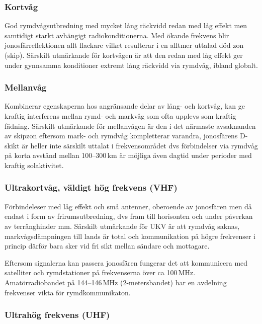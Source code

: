 \subsubsection{Kortvåg}

God rymdvågsutbredning med mycket lång räckvidd redan med låg effekt men samtidigt starkt avhängigt radiokonditionerna. Med ökande frekvens blir jonosfärreflektionen allt flackare vilket resulterar i en alltmer uttalad död zon (skip). Särskilt utmärkande för kortvågen är att den redan med låg effekt ger under gynnsamma konditioner extremt lång räckvidd via rymdvåg, ibland globalt.

\subsubsection{Mellanvåg}

Kombinerar egenskaperna hos angränsande delar av lång- och kortvåg, kan ge kraftig interferens mellan rymd- och markvåg som ofta upplevs som kraftig fädning. Särskilt utmärkande för mellanvågen är den i det närmaste avsaknanden av skipzon eftersom mark- och rymdvåg kompletterar varandra, jonosfärens D-skikt är heller inte särskilt uttalat i frekvensområdet dvs förbindelser via rymdvåg på korta avstånd mellan 100--300\,km är möjliga även dagtid under perioder med kraftig solaktivitet.

\subsubsection{Ultrakortvåg, väldigt hög frekvens (VHF)}

Förbindeleser med låg effekt och små antenner, oberoende av jonosfären men då endast i form av frirumsutbredning, dvs fram till horisonten och under påverkan av terränghinder mm. Särskilt utmärkande för UKV är att rymdvåg saknas, markvågsdämpningen till lands är total och kommunikation på högre frekvenser i princip därför bara sker vid fri sikt mellan sändare och mottagare.

Eftersom signalerna kan passera jonosfären fungerar det att kommunicera med satelliter och rymdstationer på frekvenserna över ca 100\,MHz. Amatörradiobandet på 144--146\,MHz (2-metersbandet) har en avdelning frekvenser vikta för rymdkommunikaton.

\subsubsection{Ultrahög frekvens (UHF)}

